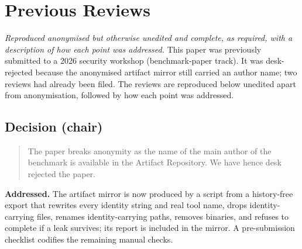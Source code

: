 \documentclass[conference]{IEEEtran}
\begin{document}



\clearpage
\appendix
\section*{Previous Reviews}
\emph{Reproduced anonymised but otherwise unedited and complete, as required, with a description of how each point was addressed.}
This paper was previously submitted to a 2026 security workshop (benchmark-paper track). It was desk-rejected because the anonymised artifact mirror still carried an author name; two reviews had already been filed. The reviews are reproduced below unedited apart from anonymisation, followed by how each point was addressed.

\subsection*{Decision (chair)}
\begin{quote}\small
The paper breaks anonymity as the name of the main author of the benchmark is available in the Artifact Repository. We have hence desk rejected the paper.
\end{quote}
\textbf{Addressed.} The artifact mirror is now produced by a script from a history-free export that rewrites every identity string and real tool name, drops identity-carrying files, renames identity-carrying paths, removes binaries, and refuses to complete if a leak survives; its report is included in the mirror. A pre-submission checklist codifies the remaining manual checks.
\end{document}

